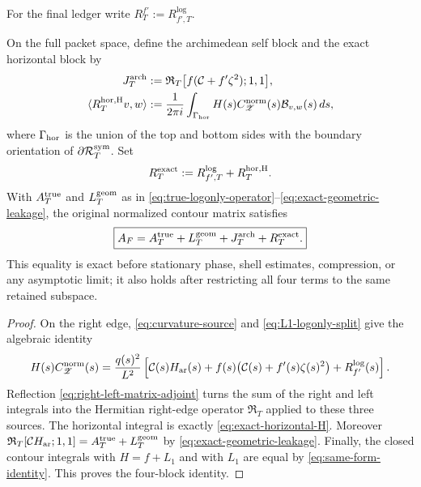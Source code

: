 For the final ledger write $R_T^{f'}:=R_{f',T}^{\log}$.

\begin{proposition}
\label{prop:exact-four-block-decomposition}
On the full packet space, define the archimedean self block and the exact
horizontal block by
\begin{align}
J_T^{\rm arch}
&:=\mathfrak R_T\bigl[f(\mathcal C+f'\zeta^2);1,1\bigr],
\label{eq:exact-arch-block}\\
\langle R_T^{\rm hor,H}v,w\rangle
&:=\frac1{2\pi i}\int_{\Gamma_{\rm hor}}
H(s)C_{\mathscr Z}^{\rm norm}(s)\mathcal B_{v,w}(s)\,ds,
\label{eq:exact-horizontal-H}
\end{align}
where $\Gamma_{\rm hor}$ is the union of the top and bottom sides with the
boundary orientation of $\partial\mathcal R_T^{\rm sym}$. Set
\begin{equation}
R_T^{\rm exact}:=R_{f',T}^{\log}+R_T^{\rm hor,H}.
\label{eq:exact-fourth-block}
\end{equation}
With $A_T^{\rm true}$ and $L_T^{\rm geom}$ as in
\eqref{eq:true-logonly-operator}--\eqref{eq:exact-geometric-leakage}, the
original normalized contour matrix satisfies
\begin{equation}
\boxed{
A_F=A_T^{\rm true}+L_T^{\rm geom}+J_T^{\rm arch}+R_T^{\rm exact}.
}
\label{eq:exact-four-block-decomposition}
\end{equation}
This equality is exact before stationary phase, shell estimates, compression,
or any asymptotic limit; it also holds after restricting all four terms to the
same retained subspace.
\end{proposition}

\begin{proof}
On the right edge, \eqref{eq:curvature-source} and
\eqref{eq:L1-logonly-split} give the algebraic identity
\[
H(s)C_{\mathscr Z}^{\rm norm}(s)
=\frac{q(s)^2}{L^2}\left[
\mathcal C(s)H_{\rm ar}(s)
+f(s)\bigl(\mathcal C(s)+f'(s)\zeta(s)^2\bigr)
+R_{f'}^{\log}(s)\right].
\]
Reflection \eqref{eq:right-left-matrix-adjoint} turns the sum of the right and
left integrals into the Hermitian right-edge operator $\mathfrak R_T$ applied
to these three sources.  The horizontal integral is exactly
\eqref{eq:exact-horizontal-H}. Moreover
$\mathfrak R_T[\mathcal C H_{\rm ar};1,1]
=A_T^{\rm true}+L_T^{\rm geom}$ by
\eqref{eq:exact-geometric-leakage}.  Finally, the closed contour integrals
with $H=f+L_1$ and with $L_1$ are equal by
\eqref{eq:same-form-identity}. This proves the four-block identity.
\end{proof}

